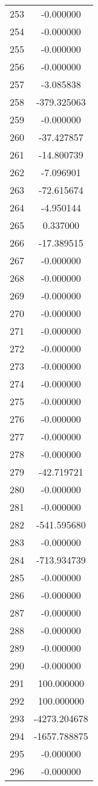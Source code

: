 \documentclass[12pt]{article}
\begin{document}
\begin{longtable}{@{}cc@{}}
253 & -0.000000 \\
254 & -0.000000 \\
255 & -0.000000 \\
256 & -0.000000 \\
257 & -3.085838 \\
258 & -379.325063 \\
259 & -0.000000 \\
260 & -37.427857 \\
261 & -14.800739 \\
262 & -7.096901 \\
263 & -72.615674 \\
264 & -4.950144 \\
265 & 0.337000 \\
266 & -17.389515 \\
267 & -0.000000 \\
268 & -0.000000 \\
269 & -0.000000 \\
270 & -0.000000 \\
271 & -0.000000 \\
272 & -0.000000 \\
273 & -0.000000 \\
274 & -0.000000 \\
275 & -0.000000 \\
276 & -0.000000 \\
277 & -0.000000 \\
278 & -0.000000 \\
279 & -42.719721 \\
280 & -0.000000 \\
281 & -0.000000 \\
282 & -541.595680 \\
283 & -0.000000 \\
284 & -713.934739 \\
285 & -0.000000 \\
286 & -0.000000 \\
287 & -0.000000 \\
288 & -0.000000 \\
289 & -0.000000 \\
290 & -0.000000 \\
291 & 100.000000 \\
292 & 100.000000 \\
293 & -4273.204678 \\
294 & -1657.788875 \\
295 & -0.000000 \\
296 & -0.000000 \\

\end{longtable}
\end{document}
